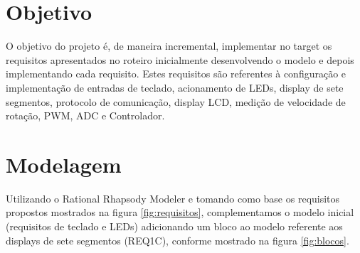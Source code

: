 \documentclass{article}
\begin{document}


\onehalfspacing
\section{Objetivo} 
O objetivo do projeto é, de maneira incremental, implementar no target os requisitos apresentados no roteiro\cite{bb:roteiro} inicialmente desenvolvendo o modelo e depois implementando cada requisito. Estes requisitos são referentes à configuração e implementação de entradas de teclado, acionamento de LEDs, display de sete segmentos, protocolo de comunicação, display LCD, medição de velocidade de rotação, PWM, ADC e Controlador. 
	
\section{Modelagem}
Utilizando o Rational Rhapsody Modeler e tomando como base os requisitos propostos mostrados na figura \ref{fig:requisitos}, complementamos o modelo inicial\cite{bb:modelo} (requisitos de teclado e LEDs) adicionando um bloco ao modelo referente aos displays de sete segmentos (REQ1C), conforme mostrado na figura \ref{fig:blocos}.
\end{document}
